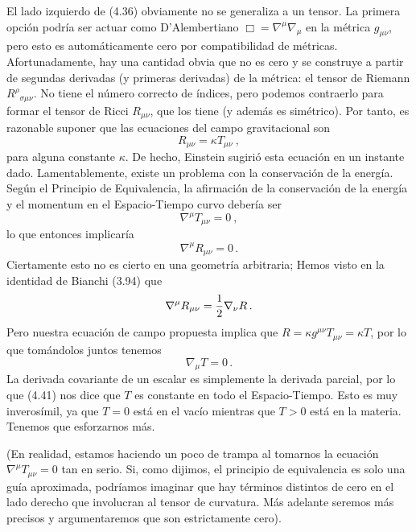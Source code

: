 \documentclass[11pt,b5paper,openany,twoside]{book}
\newcommand{\mn}{{\mu\nu}}
\begin{document}
El lado izquierdo de (4.36) obviamente no se generaliza a un tensor.
La primera opción podría ser actuar como D'Alembertiano $\Box = \nabla^\mu \nabla_\mu$ en la métrica $g_\mn$, pero esto es automáticamente cero por compatibilidad de métricas.
Afortunadamente, hay una cantidad obvia que no es cero y se construye a partir de segundas derivadas (y primeras derivadas) de la métrica: el tensor de Riemann $R^\rho{}_{\sigma\mn}$.
No tiene el número correcto de índices, pero podemos contraerlo para formar el tensor de Ricci $R_{\mn}$, que los tiene (y además es simétrico).
Por tanto, es razonable suponer que las ecuaciones del campo gravitacional son
\begin{equation}
R_{\mn} = \kappa T_{\mn}\ ,\label{4.37}
\end{equation}
para alguna constante $\kappa$.
De hecho, Einstein sugirió esta ecuación en un instante dado.
Lamentablemente, existe un problema con la conservación de la energía.
Según el Principio de Equivalencia, la afirmación de la conservación de la energía y el momentum en el Espacio-Tiempo curvo debería ser
\begin{equation}
\nabla^\mu T_{\mn} =0\ ,\label{4.38}
\end{equation}
lo que entonces implicaría
\begin{equation}
\nabla^\mu R_{\mn} =0\,.\label{4.39}
\end{equation}
Ciertamente esto no es cierto en una geometría arbitraria; Hemos visto en la identidad de Bianchi (3.94) que
\begin{equation}
\nabla^\mu R_{\mn} ={1\over 2}\nabla_\nu R\,.\label{4.40}
\end{equation}
Pero nuestra ecuación de campo propuesta implica que $R=\kappa g^{\mn} T_{\mn} = \kappa T$, por lo que tomándolos juntos tenemos
\begin{equation}
\nabla_\mu T=0\,.\label{4.41}
\end{equation}
La derivada covariante de un escalar es simplemente la derivada parcial, por lo que (4.41) nos dice que $T$ es constante en todo el Espacio-Tiempo.
Esto es muy inverosímil, ya que $T=0$ está en el vacío mientras que $T>0$ está en la materia.
Tenemos que esforzarnos más.

(En realidad, estamos haciendo un poco de trampa al tomarnos la ecuación $\nabla^\mu T_{\mn} =0$ tan en serio.
Si, como dijimos, el principio de equivalencia es solo una guía aproximada, podríamos imaginar que hay términos distintos de cero en el lado derecho que involucran al tensor de curvatura.
Más adelante seremos más precisos y argumentaremos que son estrictamente cero).
\end{document}
